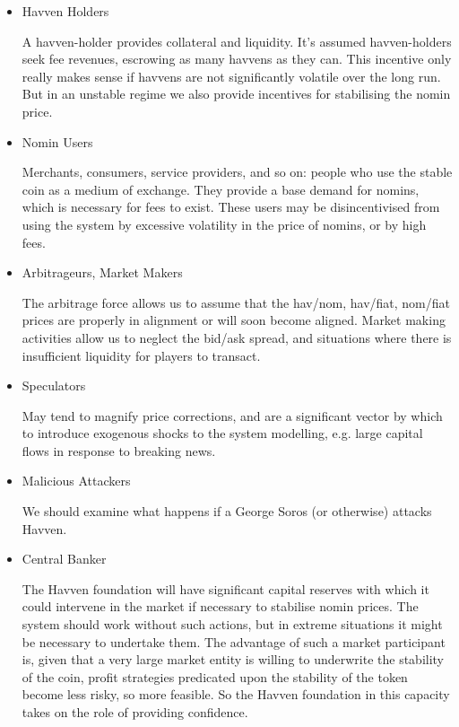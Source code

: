 \begin{itemize}
	\item{Havven Holders}

	A havven-holder provides collateral and liquidity. It’s assumed havven-holders seek fee revenues,
	escrowing as many havvens as they can. This incentive only really makes sense if havvens are not
	significantly volatile over the long run. But in an unstable regime we also provide incentives
	for stabilising the nomin price. 

	\item{Nomin Users}

	Merchants, consumers, service providers, and so on: people who use the stable coin as a
	medium of exchange. They provide a base demand for nomins, which is necessary for fees
	to exist. These users may be disincentivised from using the system by excessive volatility
	in the price of nomins, or by high fees.

	\item{Arbitrageurs, Market Makers}

	The arbitrage force allows us to assume that the hav/nom, hav/fiat, nom/fiat
	prices are properly in alignment or will soon become aligned. Market making activities
	allow us to neglect the bid/ask spread, and situations where there is insufficient
	liquidity for players to transact.
	
	\item{Speculators}
	
	May tend to magnify price corrections, and are a significant vector by which to introduce
	exogenous shocks to the system modelling, e.g. large capital flows in response to breaking news.
	
	\item{Malicious Attackers}
	
	We should examine what happens if a George Soros (or otherwise) attacks Havven.

	\item{Central Banker}
	
	The Havven foundation will have significant capital reserves with which it could intervene
	in the market if necessary to stabilise nomin prices. The system should work without
	such actions, but in extreme situations it might be necessary to undertake them.
	The advantage of such a market participant is, given that a very large market entity is
	willing to underwrite the stability of the coin, profit strategies predicated upon the
	stability of the token become less risky, so more feasible. So the Havven foundation in
	this capacity takes on the role of providing confidence.

\end{itemize}



\pagebreak